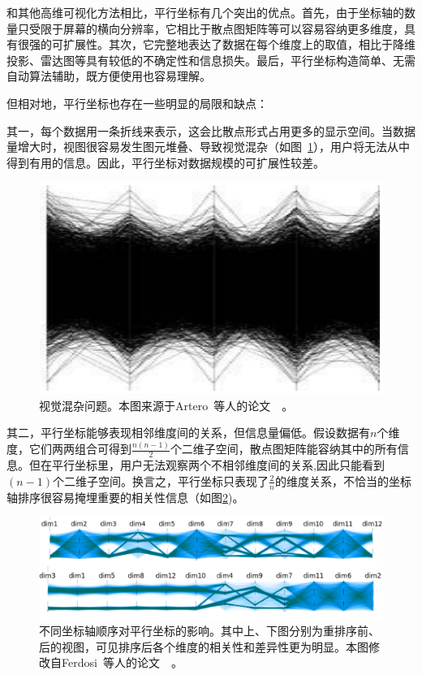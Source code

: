 \documentclass[12pt,twocolumn]{article}
\begin{document}
和其他高维可视化方法相比，平行坐标有几个突出的优点。首先，由于坐标轴的数量只受限于屏幕的横向分辨率，它相比于散点图矩阵等可以容易容纳更多维度，具有很强的可扩展性。其次，它完整地表达了数据在每个维度上的取值，相比于降维投影、雷达图等具有较低的不确定性和信息损失。最后，平行坐标构造简单、无需自动算法辅助，既方便使用也容易理解。

但相对地，平行坐标也存在一些明显的局限和缺点：

其一，每个数据用一条折线来表示，这会比散点形式占用更多的显示空间。当数据量增大时，视图很容易发生图元堆叠、导致视觉混杂（如图~\ref{fig:PC_clutter}），用户将无法从中得到有用的信息。因此，平行坐标对数据规模的可扩展性较差。

\begin{figure}[!htb]
\centering
\includegraphics[width=0.8\linewidth]{images/PC_clutter.eps}
\caption{\label{fig:PC_clutter}视觉混杂问题。本图来源于Artero~等人的论文~\citep{artero2004uncovering}~。
}
\end{figure}

其二，平行坐标能够表现相邻维度间的关系，但信息量偏低。假设数据有$n$个维度，它们两两组合可得到$\frac{n(n-1)}{2}$个二维子空间，散点图矩阵能容纳其中的所有信息。但在平行坐标里，用户无法观察两个不相邻维度间的关系,因此只能看到$(n-1)$个二维子空间。换言之，平行坐标只表现了$\frac{2}{n}$的维度关系，不恰当的坐标轴排序很容易掩埋重要的相关性信息（如图\ref{fig:PC_reordering})。

\begin{figure}[!htb]
\centering
\includegraphics[width=1.0\linewidth]{images/PC_reordering.eps}
\caption{\label{fig:PC_reordering}不同坐标轴顺序对平行坐标的影响。其中上、下图分别为重排序前、后的视图，可见排序后各个维度的相关性和差异性更为明显。本图修改自Ferdosi~等人的论文~\citep{ferdosi2011visualizing}~。
}
\end{figure}
\end{document}
